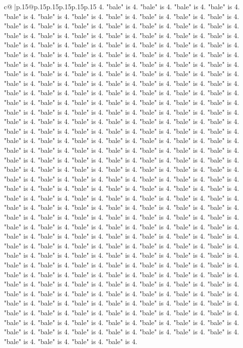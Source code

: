 \documentclass{article}
\begin{document}
{\begin{supertabular}{c@{$\;$}|p{.15\linewidth}@{}p{.15\linewidth}p{.15\linewidth}p{.15\linewidth}p{.15\linewidth}p{.15\linewidth}}
{{{4. "bale" is 4. "bale" is 4. "bale" is 4. "bale" is 4. "bale" is 4. "bale" is 4. "bale" is 4. "bale" is 4. "bale" is 4. "bale" is 4. "bale" is 4. "bale" is 4. "bale" is 4. "bale" is 4. "bale" is 4. "bale" is 4. "bale" is 4. "bale" is 4. "bale" is 4. "bale" is 4. "bale" is 4. "bale" is 4. "bale" is 4. "bale" is 4. "bale" is 4. "bale" is 4. "bale" is 4. "bale" is 4. "bale" is 4. "bale" is 4. "bale" is 4. "bale" is 4. "bale" is 4. "bale" is 4. "bale" is 4. "bale" is 4. "bale" is 4. "bale" is 4. "bale" is 4. "bale" is 4. "bale" is 4. "bale" is 4. "bale" is 4. "bale" is 4. "bale" is 4. "bale" is 4. "bale" is 4. "bale" is 4. "bale" is 4. "bale" is 4. "bale" is 4. "bale" is 4. "bale" is 4. "bale" is 4. "bale" is 4. "bale" is 4. "bale" is 4. "bale" is 4. "bale" is 4. "bale" is 4. "bale" is 4. "bale" is 4. "bale" is 4. "bale" is 4. "bale" is 4. "bale" is 4. "bale" is 4. "bale" is 4. "bale" is 4. "bale" is 4. "bale" is 4. "bale" is 4. "bale" is 4. "bale" is 4. "bale" is 4. "bale" is 4. "bale" is 4. "bale" is 4. "bale" is 4. "bale" is 4. "bale" is 4. "bale" is 4. "bale" is 4. "bale" is 4. "bale" is 4. "bale" is 4. "bale" is 4. "bale" is 4. "bale" is 4. "bale" is 4. "bale" is 4. "bale" is 4. "bale" is 4. "bale" is 4. "bale" is 4. "bale" is 4. "bale" is 4. "bale" is 4. "bale" is 4. "bale" is 4. "bale" is 4. "bale" is 4. "bale" is 4. "bale" is 4. "bale" is 4. "bale" is 4. "bale" is 4. "bale" is 4. "bale" is 4. "bale" is 4. "bale" is 4. "bale" is 4. "bale" is 4. "bale" is 4. "bale" is 4. "bale" is 4. "bale" is 4. "bale" is 4. "bale" is 4. "bale" is 4. "bale" is 4. "bale" is 4. "bale" is 4. "bale" is 4. "bale" is 4. "bale" is 4. "bale" is 4. "bale" is 4. "bale" is 4. "bale" is 4. "bale" is 4. "bale" is 4. "bale" is 4. "bale" is 4. "bale" is 4. "bale" is 4. "bale" is 4. "bale" is 4. "bale" is 4. "bale" is 4. "bale" is 4. "bale" is 4. "bale" is 4. "bale" is 4. "bale" is 4. "bale" is 4. "bale" is 4. "bale" is 4. "bale" is 4. "bale" is 4. "bale" is 4. "bale" is 4. "bale" is 4. "bale" is 4. "bale" is 4. "bale" is 4. "bale" is 4. "bale" is 4. "bale" is 4. "bale" is 4. "bale" is 4. "bale" is 4. "bale" is 4. "bale" is 4. "bale" is 4. "bale" is 4. "bale" is 4. "bale" is 4. "bale" is 4. "bale" is 4. "bale" is 4. "bale" is 4. "bale" is 4. "bale" is 4. "bale" is 4. "bale" is 4. "bale" is 4. "bale" is 4. "bale" is 4. "bale" is 4. "bale" is 4. "bale" is 4. "bale" is 4. "bale" is 4. "bale" is 4. "bale" is 4. "bale" is 4. "bale" is 4. "bale" is 4. "bale" is 4. "bale" is 4. "bale" is 4. "bale" is 4. "bale" is 4. "bale" is 4. "bale" is 4. "bale" is 4. "bale" is 4. "bale" is 4. "bale" is 4. "bale" is 4. "bale" is 4. "bale" is 4. "bale" is 4. "bale" is 4. "bale" is 4. "bale" is 4. "bale" is 4. "bale" is 4. "bale" is 4. "bale" is 4. "bale" is 4. "bale" is 4. "bale" is 4. "bale" is 4. "bale" is 4. "bale" is 4. "bale" is 4. "bale" is 4. "bale" is 4. "bale" is 4. "bale" is 4. "bale" is 4. "bale" is 4. "bale" is 4. "bale" is 4. "bale" is 4. "bale" is 4. "bale" is 4. "bale" is 4. "bale" is 4. "bale" is 4. "bale" is 4. "bale" is 4. "bale" is 4. "bale" is 4. "bale" is 4. "bale" is 4. "bale" is 4. "bale" is 4. "bale" is 4. "bale" is 4. "bale" is 4. "bale" is 4. "bale" is 4. "bale" is 4. }}}
\end{supertabular}}
\end{document}
